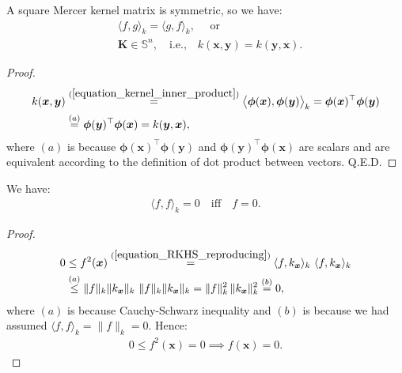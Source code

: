 \documentclass[lang=cn,10pt]{gorgeousnbook}
\numberwithin{equation}{section}%
\numberwithin{figure}{section}%
\begin{document}
\begin{lemma}\label{lemma_kernel_is_symmetric}
A square Mercer kernel matrix is symmetric, so we have:
\begin{align}
&\langle f, g \rangle_k = \langle g, f \rangle_k, \quad \text{ or } \label{equation_symmetric_inner_product}\\
&\boldsymbol{K} \in \mathbb{S}^n, \quad \text{i.e.,} \quad k(\boldsymbol{x}, \boldsymbol{y}) = k(\boldsymbol{y}, \boldsymbol{x}).
\end{align}
\end{lemma}
\begin{proof}
\begin{align*}
k(\boldsymbol{x}, \boldsymbol{y}) &\overset{(\ref{equation_kernel_inner_product})}{=} \big\langle \boldsymbol{\phi}(\boldsymbol{x}), \boldsymbol{\phi}(\boldsymbol{y}) \big\rangle_k = \boldsymbol{\phi}(\boldsymbol{x})^\top \boldsymbol{\phi}(\boldsymbol{y}) \\
&\overset{(a)}{=} \boldsymbol{\phi}(\boldsymbol{y})^\top \boldsymbol{\phi}(\boldsymbol{x}) = k(\boldsymbol{y}, \boldsymbol{x}), 
\end{align*}
where $(a)$ is because $\boldsymbol{\phi}(\boldsymbol{x})^\top \boldsymbol{\phi}(\boldsymbol{y})$ and $\boldsymbol{\phi}(\boldsymbol{y})^\top \boldsymbol{\phi}(\boldsymbol{x})$ are scalars and are equivalent according to the definition of dot product between vectors. Q.E.D.
\end{proof}

\begin{lemma}
We have:
\begin{align}
\langle f, f \rangle_k = 0 \quad \text{iff} \quad f = 0.
\end{align}
\end{lemma}
\begin{proof}
\begin{align*}
0 &\leq f^2(\boldsymbol{x}) \overset{(\ref{equation_RKHS_reproducing})}{=} \langle f, k_{\boldsymbol{x}} \rangle_k\,\, \langle f, k_{\boldsymbol{x}} \rangle_k \\
&\overset{(a)}{\leq} \|f\|_k \|k_{\boldsymbol{x}}\|_k \,\, \|f\|_k \|k_{\boldsymbol{x}}\|_k = \|f\|_k^2\, \|k_{\boldsymbol{x}}\|_k^2 \overset{(b)}{=} 0,
\end{align*}
where $(a)$ is because Cauchy-Schwarz inequality and $(b)$ is because we had assumed $\langle f, f \rangle_k = \|f\|_k = 0$. Hence:
\begin{align*}
0 \leq f^2(\boldsymbol{x}) = 0 \implies f(\boldsymbol{x}) = 0.
\end{align*}
\end{proof}
\end{document}
